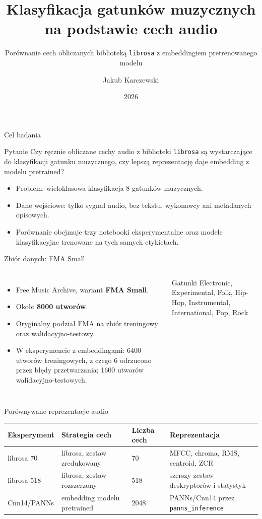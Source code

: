 \documentclass[aspectratio=1610,polish]{beamer}
\title[Klasyfikacja gatunków muzycznych]{Klasyfikacja gatunków muzycznych na podstawie cech audio}
\subtitle{Porównanie cech obliczanych biblioteką \texttt{librosa} z embeddingiem pretrenowanego modelu}
\author[J. Karczewski]{Jakub Karczewski}
\institute[AGH]{Projekt eksploracji danych}
\date{2026}
\begin{document}
\maketitle

\begin{frame}{Cel badania}
	\begin{block}{Pytanie}
		Czy ręcznie obliczane cechy audio z biblioteki \texttt{librosa} są wystarczające do klasyfikacji gatunku muzycznego, czy lepszą reprezentację daje embedding z modelu pretrained?
	\end{block}

	\begin{itemize}
		\item Problem: wieloklasowa klasyfikacja 8 gatunków muzycznych.
		\item Dane wejściowe: tylko sygnał audio, bez tekstu, wykonawcy ani metadanych opisowych.
		\item Porównanie obejmuje trzy notebooki eksperymentalne oraz modele klasyfikacyjne trenowane na tych samych etykietach.
	\end{itemize}
\end{frame}

\begin{frame}{Zbiór danych: FMA Small}
	\begin{columns}
		\begin{itemize}
			\item Free Music Archive, wariant \textbf{FMA Small}.
			\item Około \textbf{8000 utworów}.
			\item Oryginalny podział FMA na zbiór treningowy oraz walidacyjno-testowy.
			\item W eksperymencie z embeddingami: 6400 utworów treningowych, z czego 6 odrzucono przez błędy przetwarzania; 1600 utworów walidacyjno-testowych.
		\end{itemize}

		\begin{block}{Gatunki}
			\small
			Electronic, Experimental, Folk, Hip-Hop, Instrumental, International, Pop, Rock
		\end{block}
	\end{columns}
\end{frame}

\begin{frame}{Porównywane reprezentacje audio}
	\scriptsize
	\begin{tabular}{p{}p{}p{}p{}}
		\toprule
		Eksperyment & Strategia cech & Liczba cech & Reprezentacja \\
		\midrule
		librosa 70 &
		librosa, zestaw zredukowany &
		70 &
		MFCC, chroma, RMS, centroid, ZCR \\
		librosa 518 &
		librosa, zestaw rozszerzony &
		518 &
		szerszy zestaw deskryptorów i statystyk \\
		Cnn14/PANNs &
		embedding modelu pretrained &
		2048 &
		PANNs/Cnn14 przez \texttt{panns\_inference} \\
		\bottomrule
	\end{tabular}
\end{frame}
\end{document}
